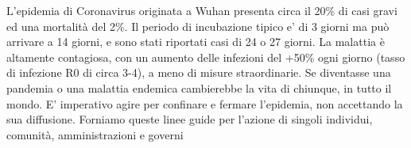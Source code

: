 \documentclass[onecolumn,journal]{IEEEtran}
\begin{document}

L’epidemia di Coronavirus originata a Wuhan presenta circa il 20\% di casi gravi ed una mortalità del 2\%. Il periodo di incubazione tipico e’ di 3 giorni ma può arrivare a 14 giorni, e sono stati riportati casi di 24 o 27 giorni. La malattia è altamente contagiosa, con un aumento delle infezioni del +50\% ogni giorno (tasso di infezione R0 di circa 3-4), a meno di misure straordinarie. Se diventasse una pandemia o una malattia endemica cambierebbe la vita di chiunque, in tutto il mondo. E’ imperativo agire per confinare e fermare l’epidemia, non accettando la sua diffusione. Forniamo queste linee guide per l’azione di singoli individui,  comunità, amministrazioni e governi
\end{document}
